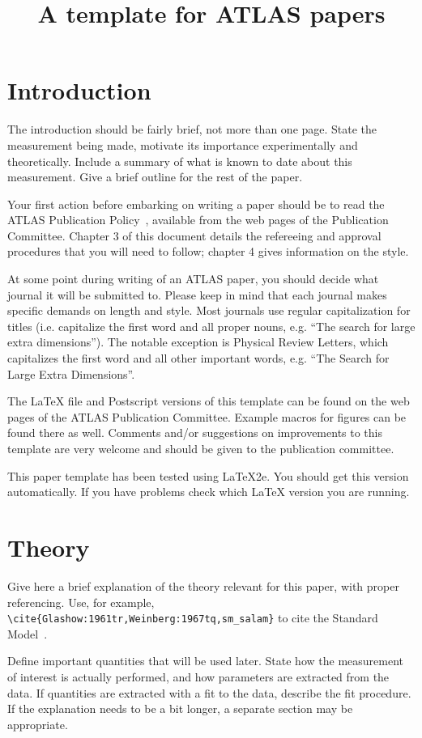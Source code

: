 \documentclass[11pt,a4paper]{atlasnote}
\title{A template for ATLAS papers}
\begin{document}
\tableofcontents
\clearpage

\section{Introduction}

The introduction should be fairly brief, not more than one page.
State the measurement being made, motivate its importance
experimentally and theoretically. Include a summary of what is known
to date about this measurement. Give a brief outline for the rest of
the paper.

Your first action before embarking on writing a paper should be to
read the ATLAS Publication Policy~\cite{publication_policy}, available
from the web pages of the Publication Committee. Chapter 3 of this
document details the refereeing and approval procedures that you will
need to follow; chapter 4 gives information on the style.

At some point during writing of an ATLAS paper, you should decide what
journal it will be submitted to.  Please keep in mind that each
journal makes specific demands on length and style.  Most journals use
regular capitalization for titles (i.e. capitalize the first word and
all proper nouns, e.g. ``The search for large extra dimensions''). The
notable exception is Physical Review Letters, which capitalizes the
first word and all other important words, e.g. ``The Search for Large
Extra Dimensions''.

The \LaTeX{} file and Postscript versions of this template can be
found on the web pages of the ATLAS Publication Committee. Example
macros for figures can be found there as well.  Comments and/or
suggestions on improvements to this template are very welcome and
should be given to the publication committee.

This paper template has been tested using \LaTeX{}2e.  You should get
this version automatically. If you have problems check which \LaTeX{}
version you are running.

\section{Theory}

Give here a brief explanation of the theory relevant for this paper,
with proper referencing. Use, for example,
\verb|\cite{Glashow:1961tr,Weinberg:1967tq,sm_salam}| to cite the
Standard Model~\cite{Glashow:1961tr,Weinberg:1967tq,sm_salam}.

Define important quantities that will be used later.  State how the
measurement of interest is actually performed, and how parameters are
extracted from the data.  If quantities are extracted with a fit to
the data, describe the fit procedure. If the explanation needs to be a
bit longer, a separate section may be appropriate.
\end{document}
